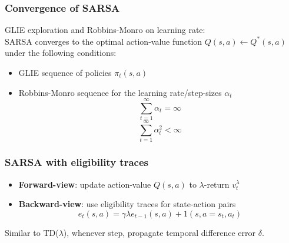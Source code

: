 \subsubsection{Convergence of SARSA}
    GLIE exploration and Robbins-Monro on learning rate:\\
    SARSA converges to the optimal action-value function $Q(s,a)\leftarrow Q^*(s,a)$ under the following conditions:
    \begin{itemize}
        \item GLIE sequence of policies $\pi_t(s,a)$
        \item Robbins-Monro sequence for the learning rate/step-sizes $\alpha_t$
        $$\sum_{t=1}^\infty\alpha_t=\infty$$
        $$\sum_{t=1}^\infty\alpha^2_t<\infty$$
    \end{itemize}
\subsubsection{SARSA with eligibility traces}
    \begin{itemize}
        \item \textbf{Forward-view}: update action-value $Q(s,a)$ to $\lambda$-return $v_t^\lambda$
        \item \textbf{Backward-view}: use eligibility traces for state-action pairs
        $$e_t(s,a)=\gamma \lambda e_{t-1}(s,a)+1(s,a=s_t,a_t)$$
    \end{itemize}
    Similar to TD($\lambda$), whenever step, propagate temporal difference error $\delta$.\\
